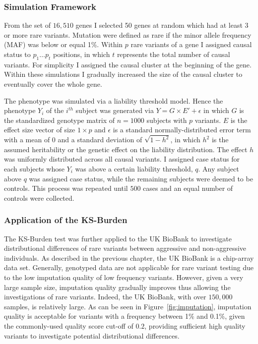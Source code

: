 \subsubsection{Simulation Framework}
\label{ssub:Simulation_Framework}
From the set of $16,510$ genes I selected 50 genes at random which had at least 3 or more rare variants. 
Mutation were defined as rare if the minor allele frequency (MAF) was below or equal 1\%. 
Within $p$ rare variants of a gene I assigned causal status to $p_1 \ldots p_t$ positions, in which $t$ represents the total number of causal variants.
For simplicity I assigned the causal cluster at the beginning of the gene.
Within these simulations I gradually increased the size of the causal cluster to eventually cover the whole gene. 

The phenotype was simulated via a liability threshold model.
Hence the phenotype $Y_i$ of the $i^{th}$ subject was generated via
$Y = G\times E' + \epsilon$
in which $G$ is the standardized genotype matrix of $n=1000$ subjects with $p$ variants.
$E$ is the effect size vector of size $1\times p$ and $\epsilon$ is a standard normally-distributed error term with a mean of $0$ and a standard deviation of $\sqrt{1-h^2}$, in which $h^2$ is the assumed heritability or the genetic effect on the liability distribution.
The effect $h$ was uniformly distributed across all causal variants.
I assigned case status for each subjects whose $Y_i$ was above a certain liability threshold, $q$.
Any subject above $q$ was assigned case status, while the remaining subjects were deemed to be controls.
This process was repeated until $500$ cases and an equal number of controls were collected.

\subsubsection{Application of the KS-Burden}
\label{ssub:Application_of_the_KS-Burden}
The KS-Burden test was further applied to the UK BioBank to investigate distributional differences of rare variants between aggressive and non-aggressive individuals.
As described in the previous chapter, the UK BioBank is a chip-array data set.
Generally, genotyped data are not applicable for rare variant testing due to the low imputation quality of low frequency variants.
However, given a very large sample size, imputation quality  gradually improves thus allowing the investigations of rare variants.
Indeed, the UK BioBank, with over $150,000$ samples, is relatively large.
As can be seen in Figure~\ref{fig:imputation}, imputation quality is acceptable for variants with a frequency between 1\% and 0.1\%, given the commonly-used quality score cut-off of $0.2$,
providing sufficient high quality variants to investigate potential distributional differences.

